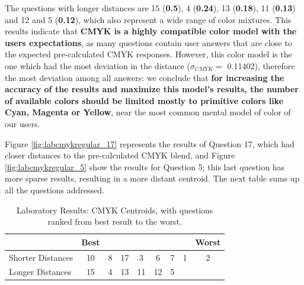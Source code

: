 %
The questions with longer distances are 15 (\textbf{0.5}), 4 (\textbf{0.24}), 13 (\textbf{0.18}), 11 (\textbf{0.13}) and 12 and 5 (\textbf{0.12}), which also represent a wide range of color mixtures. This results indicate that \textbf{CMYK is a highly compatible color model with the users expectations},
as many questions contain user answers that are close to the expected pre-calculated CMYK responses. However, this color model is the one which had the most deviation in the distance ($\sigma_{CMYK} = $ 0.11402), therefore the most deviation among all answers: we conclude that \textbf{for increasing the
accuracy of the results and maximize this model's results, the number of available colors should be limited mostly to primitive colors like Cyan, Magenta or Yellow}, near the most common mental model of color of our users.  \par
%
Figure \ref{fig:labcmykregular_17} represents the results of Question 17, which had closer distances to the pre-calculated CMYK blend, and Figure \ref{fig:labcmykregular_5} show the results for Question 5; this last question has more sparse results, resulting in a more distant
centroid. The next table sums up all the questions addressed.
%
\begin{table}[htbp]
  \centering
  \begin{tabular}{@{}lcccccccc@{}}
  \toprule
      & \multicolumn{1}{l}{Best}                        & \multicolumn{1}{l}{}                            & \multicolumn{1}{l}{}                           & \multicolumn{1}{l}{}                            & \multicolumn{1}{l}{}                            & \multicolumn{1}{l}{}                            & \multicolumn{1}{l}{}                            & \multicolumn{1}{l}{Worst}                       \\ \midrule
  \multicolumn{1}{l|}{Shorter Distances} & \multicolumn{1}{c||}{\cellcolor[HTML]{0080FF}10} & \multicolumn{1}{c||}{\cellcolor[HTML]{FF0000}8}  & \multicolumn{1}{c||}{\cellcolor[HTML]{00FF00}17} & \multicolumn{1}{c||}{\cellcolor[HTML]{80FF00}3}  & \multicolumn{1}{c||}{\cellcolor[HTML]{FF8000}6} & \multicolumn{1}{c||}{\cellcolor[HTML]{0000FF}7} & \multicolumn{1}{c||}{\cellcolor[HTML]{FFFF00}1} & \multicolumn{1}{c|}{\cellcolor[HTML]{FF00FF}2} \\ \midrule
  \multicolumn{1}{l|}{Longer Distances}  & \multicolumn{1}{c||}{\cellcolor[HTML]{00FF80}15} & \multicolumn{1}{c||}{\cellcolor[HTML]{7F00FF}4} & \multicolumn{1}{c||}{\cellcolor[HTML]{0080FF}13} & \multicolumn{1}{c||}{\cellcolor[HTML]{FF8000}11} & \multicolumn{1}{c||}{\cellcolor[HTML]{80FF00}12} & \multicolumn{1}{c||}{\cellcolor[HTML]{FF0080}5} & & \\ \bottomrule
  \end{tabular}
  \caption[Laboratory Results: CMYK Centroids]{Laboratory Results: CMYK Centroids, with questions ranked from best result to the worst.}
  \label{table:centroids_cmykresults}
\end{table}
%
